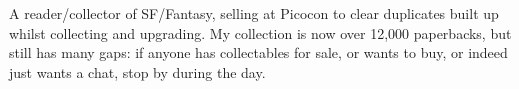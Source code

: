 A reader/collector of SF/Fantasy, selling at Picocon to clear
duplicates built up whilst collecting and upgrading. My collection is
now over 12,000 paperbacks, but still has many gaps: if anyone has
collectables for sale, or wants to buy, or indeed just wants a chat, stop
by during the day.

